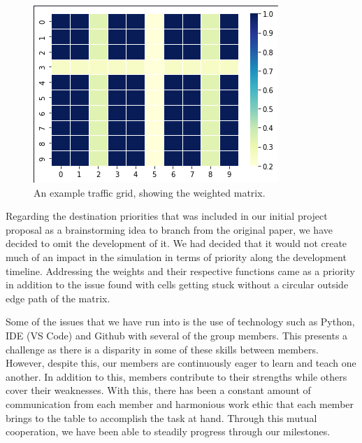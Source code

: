 \documentclass[sigplan,screen]{acmart}
\begin{document}
\begin{figure}[h]
    \centering
    \includegraphics[width=\columnwidth]{assets/wmatrix.png}
    \caption{An example traffic grid, showing the weighted matrix.}
    \label{fig:wmatrix}
\end{figure}

Regarding the destination priorities that was included in our initial project
proposal as a brainstorming idea to branch from the original paper, we have
decided to omit the development of it. We had decided that it would not create
much of an impact in the simulation in terms of priority along the development
timeline. Addressing the weights and their respective functions came as a
priority in addition to the issue found with cells getting stuck without a
circular outside edge path of the matrix.  

Some of the issues that we have run into is the use of technology such as
Python, IDE (VS Code) and Github with several of the group members. This
presents a challenge as there is a disparity in some of these skills between
members. However, despite this, our members are continuously eager to learn and
teach one another. In addition to this, members contribute to their strengths
while others cover their weaknesses. With this, there has been a constant amount
of communication from each member and harmonious work ethic that each member
brings to the table to accomplish the task at hand. Through this mutual
cooperation, we have been able to steadily progress through our milestones.  
\end{document}
